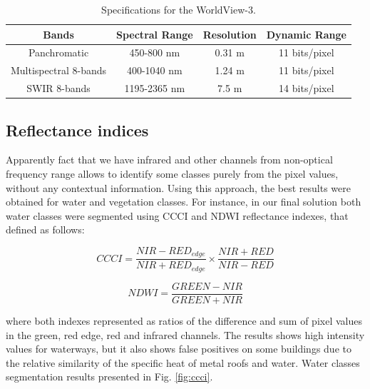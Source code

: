 \documentclass[10pt,twocolumn,letterpaper]{article}
\begin{document}
\begin{table}[th]
	\centering
	\begin{tabular}{|c|c|c|c|}
		\hline
		\textbf{Bands} & \textbf{Spectral Range} & \textbf{Resolution} & \textbf{Dynamic Range} \\ \hline
		Panchromatic & 450-800 nm & 0.31 m & 11 bits/pixel\\ \hline
		Multispectral 8-bands & 400-1040 nm & 1.24 m & 11 bits/pixel \\ \hline
		SWIR 8-bands & 1195-2365 nm & 7.5 m & 14 bits/pixel\\ \hline
	\end{tabular}
	\caption{Specifications for the WorldView-3.}
	\label{table:specs}
\end{table}


\subsection{Reflectance indices}
\label{subsec:reflectance}

Apparently fact that we have infrared and other channels from non-optical frequency range allows to identify some classes purely from the pixel values, without any contextual information. Using this approach, the best results were obtained for water and vegetation classes. For instance, in our final solution both water classes were segmented using CCCI \cite{ccci} and NDWI reflectance indexes, that defined as follows:

\begin{equation}
CCCI=\frac{NIR-RED_{edge}}{NIR+RED_{edge}}\times{\frac{NIR+RED}{NIR-RED}}
\end{equation} 

\begin{equation}
NDWI=\frac{GREEN-NIR}{GREEN+NIR}
\end{equation} 

\noindent where both indexes represented as ratios of the difference and sum of pixel values in the green, red edge, red and infrared channels. The results shows high intensity values for waterways, but it also shows false positives on some buildings due to the relative similarity of the specific heat of metal roofs and water. Water classes segmentation results presented in Fig. \ref{fig:ccci}.
\end{document}
